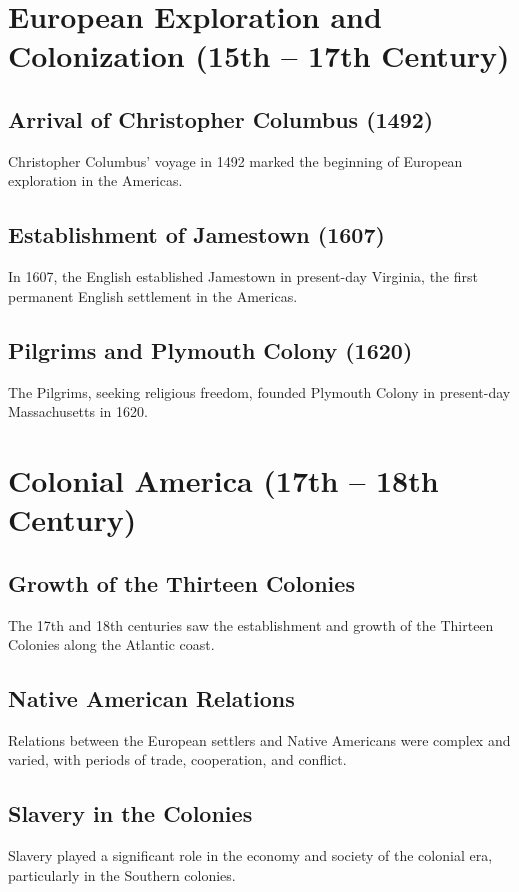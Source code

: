 \documentclass[a4paper,12pt]{book}
\begin{document}
\section{European Exploration and Colonization (15th – 17th Century)}
\label{sec:european-exploration-colonization}
\subsection{Arrival of Christopher Columbus (1492)}
\label{subsec:arrival-christopher-columbus}
Christopher Columbus' voyage in 1492 marked the beginning of European exploration in the Americas.

\subsection{Establishment of Jamestown (1607)}
\label{subsec:establishment-jamestown}
In 1607, the English established Jamestown in present-day Virginia, the first permanent English settlement in the Americas.

\subsection{Pilgrims and Plymouth Colony (1620)}
\label{subsec:pilgrims-plymouth-colony}
The Pilgrims, seeking religious freedom, founded Plymouth Colony in present-day Massachusetts in 1620.

\section{Colonial America (17th – 18th Century)}
\label{sec:colonial-america}
\subsection{Growth of the Thirteen Colonies}
\label{subsec:growth-thirteen-colonies}
The 17th and 18th centuries saw the establishment and growth of the Thirteen Colonies along the Atlantic coast.

\subsection{Native American Relations}
\label{subsec:native-american-relations}
Relations between the European settlers and Native Americans were complex and varied, with periods of trade, cooperation, and conflict.

\subsection{Slavery in the Colonies}
\label{subsec:slavery-colonies}
Slavery played a significant role in the economy and society of the colonial era, particularly in the Southern colonies.
\end{document}
